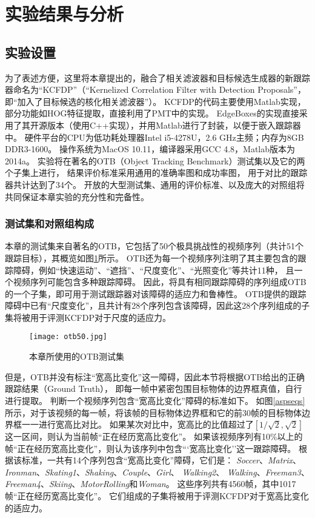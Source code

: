 \section{实验结果与分析}
\subsection{实验设置}
为了表述方便，这里将本章提出的，融合了相关滤波器和目标候选生成器的新跟踪器命名为``KCFDP''（``Kernelized Correlation Filter with Detection Proposals''，即``加入了目标候选的核化相关滤波器''）。
KCFDP的代码主要使用Matlab实现，部分功能如HOG特征提取，直接利用了PMT中的实现。
EdgeBoxes的实现直接采用了其开源版本（使用C++实现），并用Matlab进行了封装，以便于嵌入跟踪器中。
硬件平台的CPU为低功耗处理器Intel i5-4278U，2.6 GHz主频；内存为8GB DDR3-1600。
操作系统为MacOS 10.11，编译器采用GCC 4.8，Matlab版本为2014a。
实验将在著名的OTB（Object Tracking Benchmark）测试集以及它的两个子集上进行，
结果评价标准采用通用的准确率图和成功率图，
用于对比的跟踪器共计达到了34个。
开放的大型测试集、通用的评价标准、以及庞大的对照组将共同保证本章实验的充分性和完备性。

\subsubsection{测试集和对照组构成}
\label{datasetcomponetsec}
本章的测试集来自著名的OTB，它包括了50个极具挑战性的视频序列（共计51个跟踪目标），其概览如图\ref{otb50}所示。
OTB还为每一个视频序列注明了其主要包含的跟踪障碍，例如``快速运动''、``遮挡''、``尺度变化''、``光照变化''等共计11种，
且一个视频序列可能包含多种跟踪障碍。
因此，将具有相同跟踪障碍的序列组成OTB的一个子集，即可用于测试跟踪器对该障碍的适应力和鲁棒性。
OTB提供的跟踪障碍中已有``尺度变化''，且共计有28个序列包含该障碍，因此这28个序列组成的子集将被用于评测KCFDP对于尺度的适应力。

\begin{figure}[htb]
	\centering
		\texttt{[image: otb50.jpg]}
	\caption{本章所使用的OTB测试集}
	\label{otb50}
\end{figure}

但是，OTB并没有标注``宽高比变化''这一障碍，因此本节将根据OTB给出的正确跟踪结果（Ground Truth），
即每一帧中紧密包围目标物体的边界框真值，自行进行提取。
判断一个视频序列包含``宽高比变化''障碍的标准如下。
如图\ref{aspseqs}所示，对于该视频的每一帧，将该帧的目标物体边界框和它的前30帧的目标物体边界框一一进行宽高比对比。
如果某次对比中，宽高比的比值超过了$[1/\sqrt{2}, \sqrt{2} ]$这一区间，则认为当前帧``正在经历宽高比变化''。
如果该视频序列有10\%以上的帧``正在经历宽高比变化''，则认为该序列中包含```宽高比变化''这一跟踪障碍。
根据该标准，一共有14个序列包含``宽高比变化''障碍，它们是：
\textit{Soccer}、\textit{Matrix}、\textit{Ironman}、\textit{Skating1}、\textit{Shaking}、\textit{Couple}、\textit{Girl}、
\textit{Walking2}、 \textit{Walking}、\textit{Freeman3}、\textit{Freeman4}、\textit{Skiing}、\textit{MotorRolling}和\textit{Woman}。
这些序列共有4560帧，其中1017帧``正在经历宽高比变化''。
它们组成的子集将被用于评测KCFDP对于宽高比变化的适应力。

